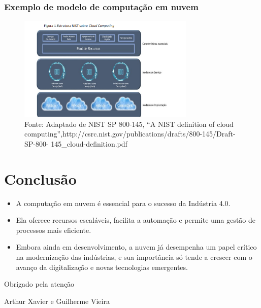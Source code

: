 \documentclass[serif, aspectratio=169]{beamer}
\begin{document}
\begin{frame}
	\frametitle<presentation>{Exemplo de modelo de computação em nuvem}
	\begin{figure}
		\centering
			\includegraphics[height=5cm]{pic/imagem_2024-09-20_150349691.png}
		\caption{Fonte: Adaptado de NIST SP 800-145, “A NIST definition of cloud
computing”,http://csrc.nist.gov/publications/drafts/800-145/Draft-SP-800-
145_cloud-definition.pdf}
		\label{fig:unilogo}
	\end{figure}
\end{frame}


\section{Conclusão}
\begin{frame}
    \begin{itemize}
        \item A computação em nuvem é essencial para o sucesso da Indústria 4.0.
        \item Ela oferece recursos escaláveis, facilita a automação e permite uma gestão de processos mais eficiente.
        \item Embora ainda em desenvolvimento, a nuvem já desempenha um papel crítico na modernização das indústrias, e sua importância só tende a crescer com o avanço da digitalização e novas tecnologias emergentes.

    \end{itemize}
\end{frame}


\begin{frame}
\begin{center}
{ Obrigado pela atenção}
\vspace{1cm}

Arthur Xavier e  Guilherme Vieira \\[1em]

\end{center}
\end{frame}
\end{document}
